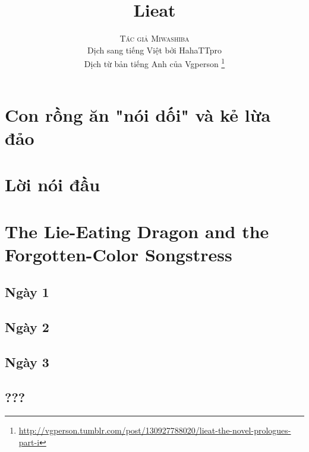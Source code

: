 \documentclass[13pt]{extarticle}
\title{\Huge \textbf{Lieat} \\ }
\author{\textsc{Tác giả Miwashiba} \\ Dịch sang tiếng Việt bởi HahaTTpro \\ Dịch từ bản tiếng Anh của Vgperson \thanks{\url{http://vgperson.tumblr.com/post/130927788020/lieat-the-novel-prologues-part-i}}}
\begin{document}
	
	\maketitle
	
	\pagebreak
		
	\tableofcontents
	
	\pagebreak
	
	\section{Con rồng ăn "nói dối" và kẻ lừa đảo}
	
	
	\section{Lời nói đầu}
	
	
	
	\section{The Lie-Eating Dragon and the Forgotten-Color Songstress}
	
	
	\subsection*{Ngày 1}
	
	
	
	\subsection*{Ngày 2}
	
	
	
	\subsection*{Ngày 3}
	
	
	\subsection*{???}
	
	
\end{document}
